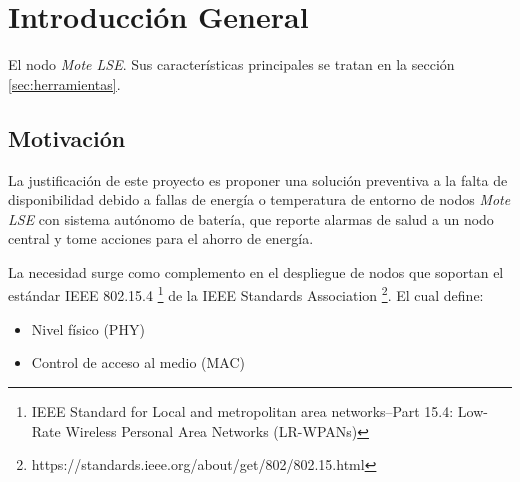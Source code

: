
\chapter{Introducción General} %

\label{Chapter1} %
\label{IntroGeneral}


\newcommand{\keyword}[1]{\textbf{#1}}
\newcommand{\tabhead}[1]{\textbf{#1}}
\newcommand{\code}[1]{\texttt{#1}}
\newcommand{\file}[1]{\texttt{\bfseries#1}}
\newcommand{\option}[1]{\texttt{\itshape#1}}
\newcommand{\grados}{$^{\circ}$}


El nodo \textit{Mote LSE}. Sus características principales se tratan en la sección \ref{sec:herramientas}.


\section{Motivación}
\label{sec:Motivación}

La justificación de este proyecto es proponer una solución preventiva a la falta de disponibilidad debido a fallas de energía o temperatura de entorno de nodos \textit{Mote LSE} con sistema autónomo de batería, que reporte alarmas de salud a un nodo central y tome acciones para el ahorro de energía.

La necesidad surge como complemento en el despliegue de nodos que soportan el estándar IEEE 802.15.4 \footnote{IEEE Standard for Local and metropolitan area networks--Part 15.4: Low-Rate Wireless Personal Area Networks (LR-WPANs)} de la IEEE Standards Association \footnote{https://standards.ieee.org/about/get/802/802.15.html}. El cual define:
		\begin{itemize}
			\item Nivel físico (PHY)
			\item Control de acceso al medio (MAC)
		\end{itemize}


